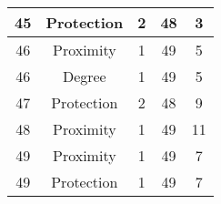 \documentclass[results.tex]{subfiles}
\begin{document}
\begin{center}
\begin{tabular}{| c || c | c | c | c |}
            \hline
            45                      & Protection                   & 2                      & 48                      & 3                    \\
            \hline
            46                      & Proximity                    & 1                      & 49                      & 5                    \\
            \hline
            46                      & Degree                       & 1                      & 49                      & 5                    \\
            \hline
            47                      & Protection                   & 2                      & 48                      & 9                    \\
            \hline
            48                      & Proximity                    & 1                      & 49                      & 11                   \\
            \hline
            49                      & Proximity                    & 1                      & 49                      & 7                    \\
            \hline
            49                      & Protection                   & 1                      & 49                      & 7                    \\
            \hline
        \end{tabular}
    \end{center}
\end{document}
